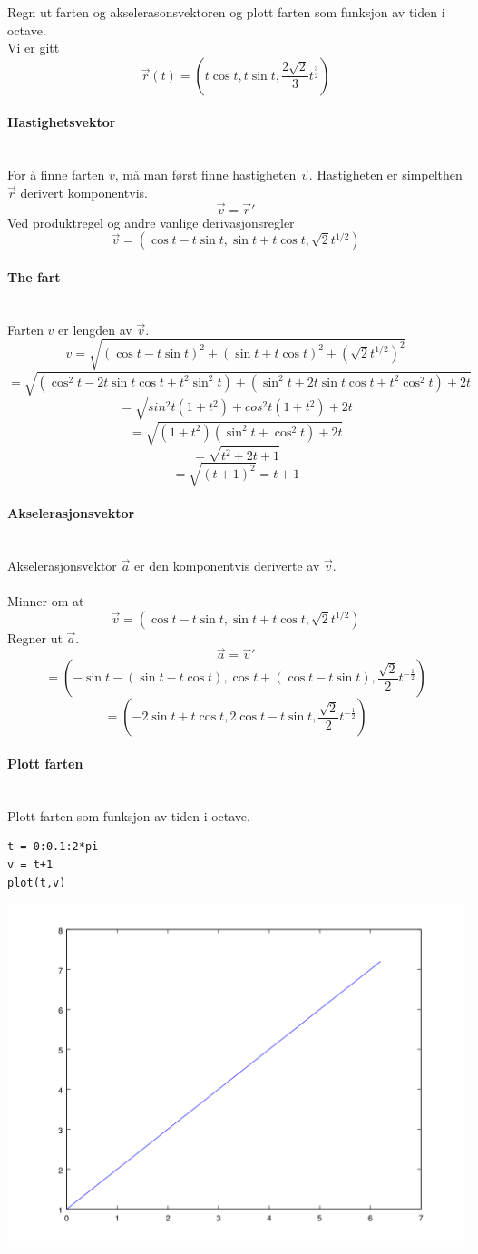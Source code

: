 Regn ut farten og akselerasonsvektoren
og plott farten som funksjon av tiden i octave.\\

Vi er gitt
$$\vec{r}(t) = (t\cos{t},t\sin{t},\frac{2 \sqrt{2}}{3}t^{\frac{3}{2}})$$

\paragraph{Hastighetsvektor} \mbox{} \\
For å finne farten $v$, må man først finne hastigheten $\vec{v}$.
Hastigheten er simpelthen $\vec{r}$ derivert komponentvis.
$$\vec{v} = \vec{r}'$$
Ved produktregel og andre vanlige derivasjonsregler
$$\vec{v} = (\cos{t}-t\sin{t}, \sin{t}+t\cos{t},\sqrt{2}t^{1/2})$$

\paragraph{The fart} \mbox{} \\
Farten $v$ er lengden av $\vec{v}$.
$$v = \sqrt{(\cos{t}-t\sin{t})^2 + (\sin{t}+t\cos{t})^2 + (\sqrt{2}t^{1/2})^2}$$
$$= \sqrt{(\cos^2t-2t\sin{t}\cos{t}+t^2\sin^2t)
+ (\sin^2t+2t\sin{t}\cos{t}+t^2\cos^2t) + 2t}$$
$$= \sqrt{sin^2t(1+t^2) + cos^2t(1+t^2) + 2t}$$
$$= \sqrt{(1+t^2)(\sin^2t+\cos^2t) + 2t}$$
$$= \sqrt{t^2 + 2t + 1}$$
$$= \sqrt{(t+1)^2} = t+1$$

\paragraph{Akselerasjonsvektor} \mbox{} \\
Akselerasjonsvektor $\vec{a}$ er den komponentvis deriverte av $\vec{v}$.\\\\
Minner om at
$$\vec{v} = (\cos{t}-t\sin{t}, \sin{t}+t\cos{t},\sqrt{2}t^{1/2})$$
Regner ut $\vec{a}$.
$$\vec{a} = \vec{v}'$$
$$= (-\sin{t}-(\sin{t}-t\cos{t}), \cos{t}+(\cos{t}-t\sin{t}),
     \frac{\sqrt{2}}{2}t^{-\frac{1}{2}})$$
$$= (-2\sin{t}+t\cos{t}, 2\cos{t}-t\sin{t},
     \frac{\sqrt{2}}{2}t^{-\frac{1}{2}})$$

\paragraph{Plott farten} \mbox{} \\
Plott farten som funksjon av tiden i octave.

\begin{lstlisting}
t = 0:0.1:2*pi
v = t+1
plot(t,v)
\end{lstlisting}
\includegraphics[width=\textwidth]{./img/oppg3.png}

